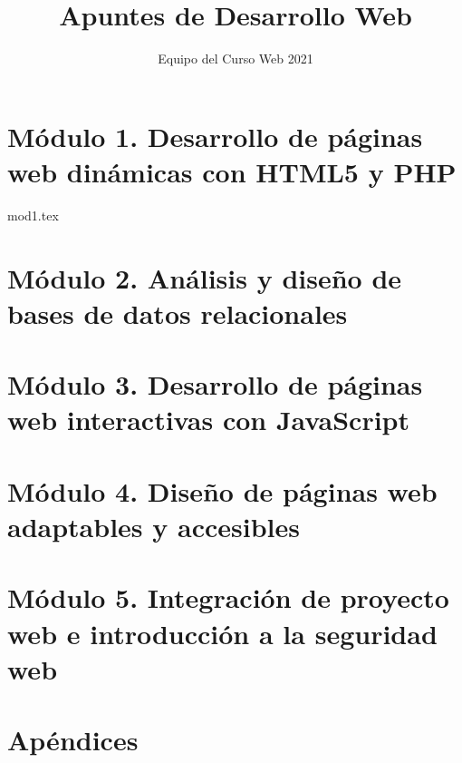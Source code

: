 \documentclass[12pt]{report}
\title{Apuntes de Desarrollo Web}
\author{Equipo del Curso Web 2021}
\begin{document}
	\maketitle
	\tableofcontents
	\chapter{Módulo 1. Desarrollo de páginas web dinámicas con HTML5 y PHP}
		{mod1.tex}
	\chapter{Módulo 2. Análisis y diseño de bases de datos relacionales}
	\chapter{Módulo 3. Desarrollo de páginas web interactivas con JavaScript}
	\chapter{Módulo 4. Diseño de páginas web adaptables y accesibles}
	\chapter{Módulo 5. Integración de proyecto web e introducción a la seguridad web}
	\appendix
	\chapter{Apéndices}
\end{document}
